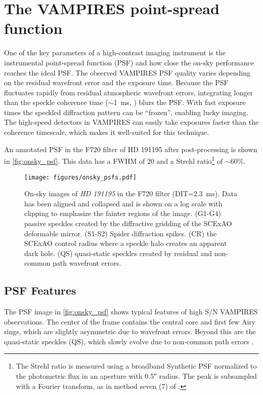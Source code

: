 \section{The VAMPIRES point-spread function}\label{sec:psf}

One of the key parameters of a high-contrast imaging instrument is the instrumental point-spread function (PSF) and how close the on-sky performance reaches the ideal PSF. The observed VAMPIRES PSF quality varies depending on the residual wavefront error and the exposure time. Because the PSF fluctuates rapidly from residual atmospheric wavefront errors, integrating longer than the speckle coherence time ($\sim$\SI{1}{\milli\second}, \citealp{kooten_climate_2022}) blurs the PSF. With fast exposure times the speckled diffraction pattern can be ``frozen'', enabling lucky imaging. The high-speed detectors in VAMPIRES can easily take exposures faster than the coherence timescale, which makes it well-suited for this technique.


An annotated PSF in the F720 filter of HD 191195 after post-processing is shown in \autoref{fig:onsky_psf}. This data has a FWHM of \SI{20}{\mas} and a Strehl ratio\footnote{The Strehl ratio is measured using a broadband Synthetic PSF normalized to the photometric flux in an aperture with \ang{;;0.5} radius. The peak is subsampled with a Fourier transform, as in method seven (7) of \citet{jr_is_2004}.} of $\sim$60\%.

\begin{figure}
    \centering
    \texttt{[image: figures/onsky\_psfs.pdf]}
    \caption{On-sky images of \textit{HD 191195} in the F720 filter (DIT=\SI{2.3}{\milli\second}). Data has been aligned and collapsed and is shown on a log scale with clipping to emphasize the fainter regions of the image. (G1-G4) passive speckles created by the diffractive gridding of the SCExAO deformable mirror. (S1-S2) Spider diffraction spikes. (CR) the SCExAO control radius where a speckle halo creates an apparent dark hole. (QS) quasi-static speckles created by residual and non-common path wavefront errors.\label{fig:onsky_psf}}
\end{figure}

\subsection{PSF Features}
The PSF image in \autoref{fig:onsky_psf} shows typical features of high S/N VAMPIRES observations. The center of the frame contains the central core and first few Airy rings, which are slightly asymmetric due to wavefront errors. Beyond this are the quasi-static speckles (QS), which slowly evolve due to non-common path errors \citep{soummer_speckle_2007,ndiaye_calibration_2013}.

